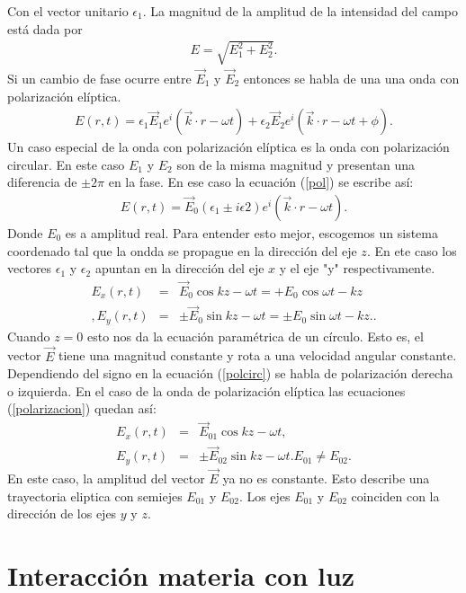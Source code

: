 \documentclass[letterpaper,12pt,oneside]{book}
\begin{document}
Con el vector unitario $\epsilon_1$. La magnitud de la amplitud de la intensidad del campo est\'a dada por
\begin{eqnarray}
E = \sqrt{E_1^2 + E_2^2}.
\end{eqnarray}
Si un cambio de fase ocurre entre $\vec E_1$ y $\vec E_2$ entonces se habla de una una onda con polarizaci\'on el\'iptica. 
\begin{eqnarray}
E(r,t) = \epsilon_1\vec E_1 e^i(\vec k\cdot r - \omega t) + \epsilon_2\vec E_2 e^i(\vec k\cdot r - \omega t + \phi).
\end{eqnarray}
Un caso especial de la onda con polarizaci\'on el\'iptica es la onda con polarizaci\'on circular. En este caso $E_1$ y $E_2$ son de la misma magnitud y presentan una diferencia de $\pm2\pi$ en la fase. En ese caso la ecuaci\'on (\ref{pol}) se escribe as\'i:
\begin{eqnarray}
E(r,t) = \vec E_0 (\epsilon_1 \pm i\epsilon2)e^i(\vec k\cdot r - \omega t)\label{polcirc}.
\end{eqnarray}
Donde $E_0$ es a amplitud real. Para entender esto mejor, escogemos un sistema coordenado tal que la ondda se propague en la direcci\'on del eje $z$. En ete caso los vectores $\epsilon_1$ y $\epsilon_2$ apuntan en la direcci\'on del eje $x$ y el eje "y" respectivamente. 
\begin{eqnarray}
E_x(r,t) &=& \vec E_0 \cos{kz-\omega t} = +E_0\cos{\omega t -kz} \nonumber\\,
E_y(r,t) &=&\pm \vec E_0 \sin{kz-\omega t} = \pm E_0\sin{\omega t -kz}. \label{polarizacion}.
\end{eqnarray}
Cuando $z=0$ esto nos da la ecuaci\'on param\'etrica de un c\'irculo. Esto es, el vector $\vec E$ tiene una magnitud constante y rota a una velocidad angular constante. Dependiendo del signo en la ecuaci\'on (\ref{polcirc}) se habla de polarizaci\'on derecha o izquierda. En el caso de la onda de polarizaci\'on el\'iptica las ecuaciones (\ref{polarizacion}) quedan as\'i:
%
\begin{eqnarray}
E_x(r,t) &=& \vec E_{01} \cos{kz-\omega t},\\
E_y(r,t) &=& \pm \vec E_{02} \sin{kz-\omega t}. E_{01} \neq E_{02} \label{poleliptica}.
\end{eqnarray}
%
En este caso, la amplitud del vector $\vec{E}$ ya no es constante. Esto describe una trayectoria eliptica con semiejes $E_{01}$ y $E_{02}$. 
Los ejes $E_{01}$ y $E_{02}$ coinciden con la direcci\'on de los ejes $y$ y $z$. 


\section{Interacci\'on materia con luz}
\end{document}
